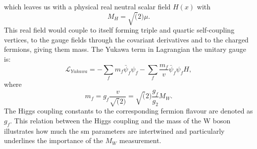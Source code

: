   which leaves us with a physical real neutral scalar field $H(x)$ with 
    \begin{equation}
	M_H=\sqrt(2)\mu.
  \end{equation}
 This real field would couple to itself forming triple and quartic self-coupling vertices, to the gauge fields through the covariant derivatives and to the charged fermions, giving them mass. The Yukawa term in Lagrangian the unitary gauge is:
     \begin{equation}
\mathcal{L}_{Yukawa}=-\sum_f m_f \bar\psi_f\psi_f-\sum_f \frac{m_f}{v} \bar\psi_f\psi_f H,
 \end{equation}
where
\begin{equation}
m_f=g_f\frac{v}{\sqrt(2)}=\sqrt(2)\frac{g_f}{g_2}M_W.
\end{equation}
The Higgs coupling constants to the corresponding fermion flavour are denoted as $g_f$. This relation between the Higgs coupling and the mass of the W boson illustrates how much the \gls{sm} parameters are intertwined and particularly underlines the importance of the $M_W$ measurement.
